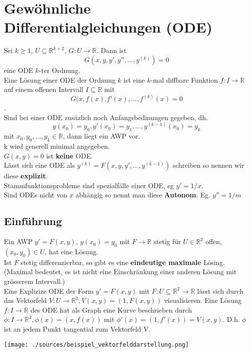 \section{Gewöhnliche Differentialgleichungen (ODE)}
  Sei $k\geq1$, $U\subseteq\mathbb R^{k+2}$, $G:U\rightarrow\mathbb R$. Dann ist 
  $$G(x,y,y',y'',...,y^{(k)})=0$$ eine ODE $k$-ter Ordnung.\\
  Eine Lösung einer ODE der Ordnung $k$ ist eine $k$-mal diffbare Funktion $f:I\rightarrow\mathbb R$
  auf einem offenen Intervall $I\subseteq\mathbb R$ mit $$G(x, f(x). f'(x),...,
  f^{(k)}(x)=0$$.\\
  Sind bei einer ODE zusäzlich noch Anfangsbedinungen gegeben, dh.
  $$y(x_0)=y_0,y'(x_0)=y_1,...,y^{(k-1)}(x_0)=y_k$$ mit $x_0,
  y_0,...,y_k\in\mathbb R$, dann liegt ein AWP vor.\\
   k wird generell minimal angegeben. \\
  $G(x, y)=0$ ist \textbf{keine} ODE.\\
  Lässt sich eine ODE als $y^{(k)}=F(x,y,y',...,y^{(k-1)})$ schreiben so nennen
  wir diese \textbf{explizit}.\\
  Stammfunktionsprobleme sind spezialfälle einer ODE, eg $y'=1/x$.\\
  Sind ODEs nicht von $x$ abhängig so nennt man diese \textbf{Autonom}. Eg.
  $y''=1/m$\\
\subsection{Einführung}
  Ein AWP $y'=F(x,y)$, $y(x_0)=y_0$ mit $F\rightarrow\mathbb R$ stetig für
  $U\in\mathbb R^2$ offen, $(x_0,y_0)\in U$, hat eine Lösung.\\
  Ist $F$ stetig differenzierbar, so gibt es eine \textbf{eindeutige maximale}
  Lösing. (Maximal bedeutet, es ist nicht eine Einschränkung einer anderen Lösung
  mit grösserem Intervall.)\\
  Eine Explizize ODE der Form $y'=F(x,y)$ mit $F: U\subseteq\mathbb 
  R^2\rightarrow\mathbb R$ lässt sich durch das Vektorfeld $V: 
  U\rightarrow\mathbb R^2, V(x,y) = (1, F(x,y))$ visualisieren. Eine Lösung $f: 
  I\rightarrow\mathbb R$ des ODE hat als Graph eine Kurve beschrieben durch
  $\phi:I\rightarrow\mathbb R^2, \phi(x)=(x,f(x))$ mit $\phi'(x)=(1,
  f'(x))=V(x,y)$. D.h. $\phi$ ist an jedem Punkt tangential zum Vektorfeld V.\\
  \begin{minipage}{\linewidth}
    \texttt{[image: ./sources/beispiel\_vektorfelddarstellung.png]}
  \end{minipage}
